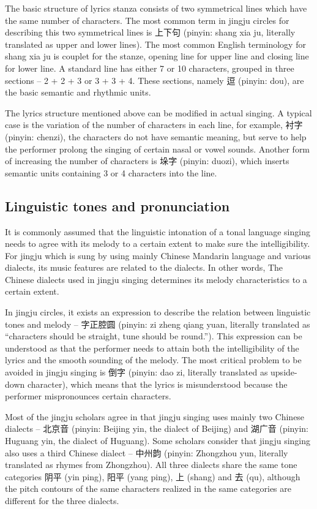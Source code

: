 The basic structure of lyrics stanza consists of two symmetrical lines which have the same number of characters. The most common term in jingju circles for describing this two symmetrical lines is 上下句 (pinyin: shang xia ju, literally translated as upper and lower lines). The most common English terminology for shang xia ju is couplet for the stanze, opening line for upper line and closing line for lower line. A standard line has either 7 or 10 characters, grouped in three sections -- 2 + 2 + 3 or 3 + 3 + 4. These sections, namely 逗 (pinyin: dou), are the basic semantic and rhythmic units.

The lyrics structure mentioned above can be modified in actual singing. A typical case is the variation of the number of characters in each line, for example, 衬字 (pinyin: chenzi), the characters do not have semantic meaning, but serve to help the performer prolong the singing of certain nasal or vowel sounds. Another form of increasing the number of characters is 垛字 (pinyin: duozi), which inserts semantic units containing 3 or 4 characters into the line.

\subsection{Linguistic tones and pronunciation}

It is commonly assumed that the linguistic intonation of a tonal language singing needs to agree with its melody to a certain extent to make sure the intelligibility. For jingju which is sung by using mainly Chinese Mandarin language and various dialects, its music features are related to the dialects. In other words, The Chinese dialects used in jingju singing determines its melody characteristics to a certain extent.

In jingju circles, it exists an expression to describe the relation between linguistic tones and melody -- 字正腔圆 (pinyin: zi zheng qiang yuan, literally translated as “characters should be straight, tune should be round.”). This expression can be understood as that the performer needs to attain both the intelligibility of the lyrics and the smooth sounding of the melody. The most critical problem to be avoided in jingju singing is 倒字 (pinyin: dao zi, literally translated as upside-down character), which means that the lyrics is misunderstood because the performer mispronounces certain characters.

Most of the jingju scholars agree in that jingju singing uses mainly two Chinese dialects -- 北京音 (pinyin: Beijing yin, the dialect of Beijing) and 湖广音 (pinyin: Huguang yin, the dialect of Huguang). Some scholars consider that jingju singing also uses a third Chinese dialect -- 中州韵 (pinyin: Zhongzhou yun, literally translated as rhymes from Zhongzhou). All three dialects share the same tone categories 阴平 (yin ping), 阳平 (yang ping), 上 (shang) and 去 (qu), although the pitch contours of the same characters realized in the same categories are different for the three dialects.

